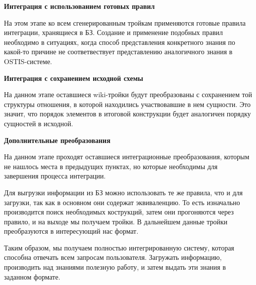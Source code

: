 \textbf{Интеграция с использованием готовых правил}

На этом этапе ко всем сгенерированным тройкам применяются готовые правила интеграции, хранящиеся в БЗ. Создание и применение подобных правил необходимо в ситуациях, когда способ представления конкретного знания по какой-то причине не соответвествует представлению аналогичного знания в OSTIS-системе.

\textbf{Интеграция с сохранением исходной схемы}

На данном этапе оставшиеся wiki-тройки будут преобразованы с сохранением той структуры отношения, в которой находились участвовавшие в нем сущности. Это значит, что порядок элементов в итоговой конструкции будет аналогичен порядку сущностей в исходной.

\textbf{Дополнительные преобразования}

На данном этапе проходят оставшиеся интеграционные преобразования, которым не нашлось места в предыдущих пунктах, но которые необходимы для завершения процесса интеграции.

Для выгрузки информации из БЗ можно использовать те же правила, что и для загрузки, так как в основном они содержат эквиваленцию. То есть изначально производится поиск необходимых кострукций, затем они прогоняются через правило, и на выходе мы получаем тройки. В дальнейшем данные тройки преобразуются в интересующий нас формат.

Таким образом, мы получаем полностью интегрированную систему, которая способна отвечать всем запросам пользователя. Загружать информацию, производить над знаниями полезную работу, и затем выдать эти знания в заданном формате.
